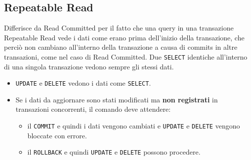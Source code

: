 \documentclass[a4paper, 10pt, titlepage]{article}
\begin{document}
		\subsection{Repeatable Read}
			Differisce da Read Committed per il fatto che una query in una transazione Repeatable Read vede i dati come erano prima dell'inizio della transazione, che perciò non cambiano all'interno della transazione a causa di commits in altre transazioni, come nel caso di Read Committed. Due \lstinline|SELECT| identiche all'interno di una singola transazione vedono sempre gli stessi dati.
			\begin{itemize}
				\item \lstinline|UPDATE| e \lstinline|DELETE| vedono i dati come \lstinline|SELECT|.
				\item Se i dati da aggiornare sono stati modificati ma \textbf{non registrati} in transazioni concorrenti, il comando deve attendere: 
				\begin{itemize}
					\item il \lstinline|COMMIT| e quindi i dati vengono cambiati e \lstinline|UPDATE| e \lstinline|DELETE| vengono bloccate con errore.
					\item il \lstinline|ROLLBACK| e quindi \lstinline|UPDATE| e \lstinline|DELETE| possono procedere.
				\end{itemize}
			\end{itemize}
			
\end{document}
